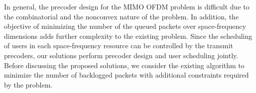 
In general, the precoder design for the \ac{MIMO} \ac{OFDM} problem is difficult due to the combinatorial and the nonconvex nature of the problem. In addition, the objective of minimizing the number of the queued packets over space-frequency dimensions adds further complexity to the existing problem. Since the scheduling of users in each space-frequency resource can be controlled by the transmit precoders, our solutions perform precoder design and user scheduling jointly. Before discussing the proposed solutions, we consider the existing algorithm to minimize the number of backlogged packets with additional constraints required by the problem.